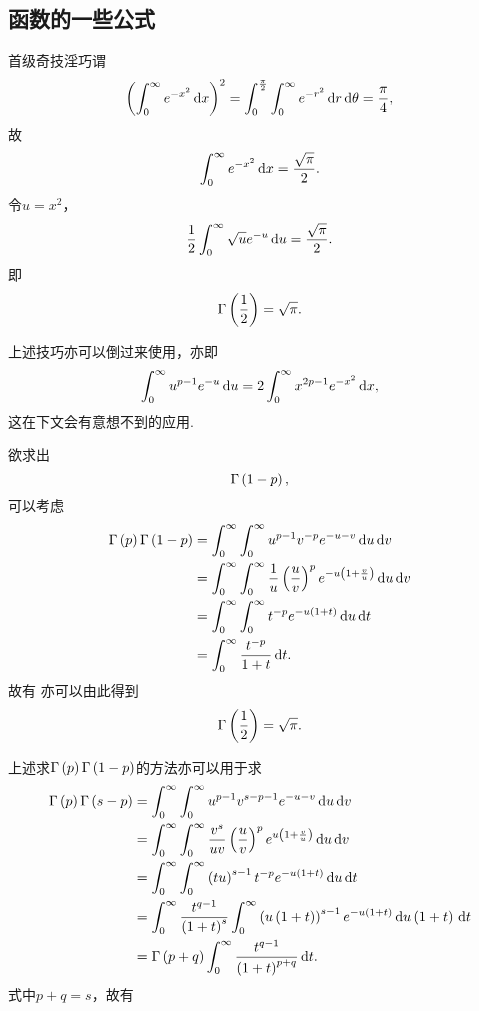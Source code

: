 \documentclass[UTF-8]{ctexart}
\begin{document}
  \subsection{\titlegamma 函数的一些公式}
  首级奇技淫巧谓
    \[ \left(\int_0^\infty e^{-x^2} \, \mathrm{d} x\right)^2 = \int_0^\frac{\pi}{2}\int_0^\infty e^{-r^2}\, \mathrm{d} r \, \mathrm{d} \theta = \frac{\pi}{4}, \]
  故
  \begin{equation}
    \label{eq:ex2}
    \int_0^\infty e^{-x^2} \, \mathrm{d} x = \frac{\sqrt{\pi}}{2}.
  \end{equation}
  令$u=x^2$，
  \[ \frac{1}{2} \int_0^\infty \sqrt{u}e^{-u} \, \mathrm{d} u = \frac{\sqrt{\pi}}{2}. \]
  即
  \[ \Gamma\left(\frac{1}{2}\right) = \sqrt{\pi}. \]
  \par
  上述技巧亦可以倒过来使用，亦即
  \begin{equation}
    \label{eq:ux2}
    \int_0^\infty u^{p-1}e^{-u} \, \mathrm{d} u = 2\int_0^\infty x^{2p-1}e^{-x^2} \, \mathrm{d} x,
  \end{equation}
  这在下文会有意想不到的应用.
  \par
  欲求出
  \[ \Gamma\left(1-p\right), \]
  可以考虑
  \begin{align*}
    \Gamma\left(p\right)\Gamma\left(1-p\right) &= \int_0^\infty \int_0^\infty u^{p-1}v^{-p}e^{-u-v} \, \mathrm{d} u \, \mathrm{d} v\\
    &=\int_0^\infty \int_0^\infty \frac{1}{u}\left(\frac{u}{v}\right)^p e^{-u\left(1+\frac{v}{u}\right)} \, \mathrm{d} u \, \mathrm{d} v\\
    &=\int_0^\infty \int_0^\infty t^{-p}e^{-u\left(1+t\right)} \, \mathrm{d} u \, \mathrm{d} t\\
    &=\int_0^\infty \frac{t^{-p}}{1+t} \, \mathrm{d} t.
  \end{align*}
  故有
  亦可以由此得到
  \[ \Gamma\left(\frac{1}{2}\right) = \sqrt{\pi}. \]
  \par
  上述求$\Gamma\left(p\right)\Gamma\left(1-p\right)$的方法亦可以用于求
  \begin{align*}
    \Gamma\left(p\right)\Gamma\left(s-p\right) &= \int_0^\infty \int_0^\infty u^{p-1}v^{s-p-1}e^{-u-v} \, \mathrm{d} u \, \mathrm{d} v \\
    &= \int_0^\infty \int_0^\infty \frac{v^s}{uv}\left(\frac{u}{v}\right)^{p}e^{u\left(1+\frac{v}{u}\right)} \, \mathrm{d} u \, \mathrm{d} v \\
    &= \int_0^\infty \int_0^\infty \left(tu\right)^{s-1}t^{-p}e^{-u\left(1+t\right)} \, \mathrm{d} u \, \mathrm{d} t \\
    &= \int_0^\infty \frac{t^{q-1}}{\left(1+t\right)^s}\int_0^\infty \left(u\left(1+t\right)\right)^{s-1}e^{-u\left(1+t\right)} \, \mathrm{d} u\left(1+t\right) \, \mathrm{d} t \\
    & = \Gamma\left(p+q\right) \int_0^\infty \frac{t^{q-1}}{\left(1+t\right)^{p+q}} \, \mathrm{d} t.
  \end{align*}
  式中$p+q=s$，故有
\end{document}
